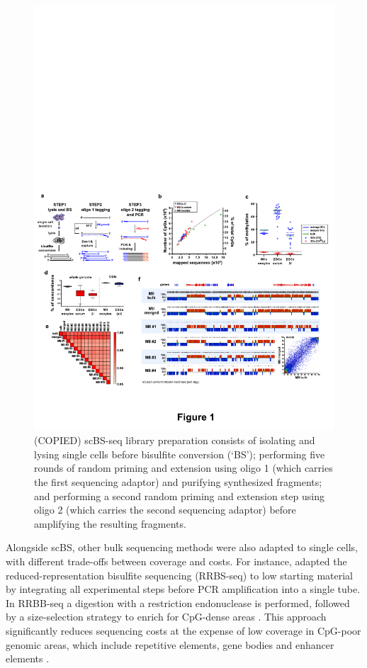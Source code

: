\begin{figure}[H]
	\centering
	\includegraphics[width=1.0\linewidth]{scBS_protocol}
	\caption[scBS-seq profiling protocol]{(COPIED) scBS-seq library preparation consists of isolating and lysing single cells before bisulfite conversion (‘BS’); performing five rounds of random priming and extension using oligo 1 (which carries the first sequencing adaptor) and purifying synthesized fragments; and performing a second random priming and extension step using oligo 2 (which carries the second sequencing adaptor) before amplifying the resulting fragments.}
	\label{fig:scBS}
\end{figure}

Alongside scBS, other bulk sequencing methods were also adapted to single cells, with different trade-offs between coverage and costs. For instance, \cite{Guo2015} adapted the reduced-representation bisulfite sequencing (RRBS-seq) to low starting material by integrating all experimental steps before PCR amplification into a single tube. In RRBB-seq a digestion with a restriction endonuclease is performed, followed by a size-selection strategy to enrich for CpG-dense areas \cite{Meissner2005}. This approach significantly reduces sequencing costs at the expense of low coverage in CpG-poor genomic areas, which include repetitive elements, gene bodies and enhancer elements \cite{Martin-Herranz2017}.

